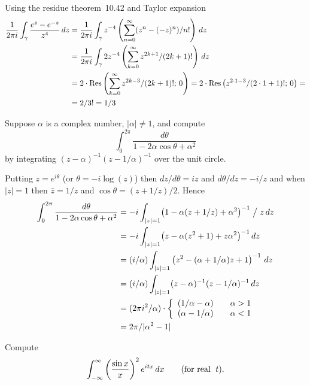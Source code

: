 \begin{enumerate}
Using the residue theorem~10.42 and Taylor expansion
\begin{align*}
\frac{1}{2\pi i} \int_\gamma \frac{e^z - e^{-z}}{z^4}\,dz
&= \frac{1}{2\pi i} \int_\gamma z^{-4}\left(\sum_{n=0}^\infty (z^n - (-z)^n)/n!\right)\,dz \\
&= \frac{1}{2\pi i} \int_\gamma 2z^{-4}\left(\sum_{k=0}^\infty z^{2k+1}/(2k+1)!\right)\,dz \\
&= 2\cdot\mathop{\rm Res}\nolimits\left(\sum_{k=0}^\infty z^{2k-3}/(2k+1)!;\,0\right)
 = 2\cdot\mathop{\rm Res}\nolimits\left(z^{2\cdot 1-3}/(2\cdot 1+1)!;\,0\right) = \\
&= 2/3! = 1/3
\end{align*}


\begin{excopy}
Suppose \(\alpha\) is a complex number, \(|\alpha|\neq 1\), and compute
\begin{equation*}
\int_0^{2\pi} \frac{d\theta}{1 - 2\alpha \cos\theta + \alpha^2}
\end{equation*}
by integrating \((z-\alpha)^{-1}(z-1/\alpha)^{-1}\) over the unit circle.
\end{excopy}

Putting \(z=e^{i\theta}\) (or \(\theta = -i\log(z)\))
then \(dz/d\theta = iz\) and \(d\theta/dz = -i/z\)
and when \(|z|=1\)
then \(\bar{z}=1/z\) and \(\cos \theta = (z+1/z)/2\).
Hence
\begin{align*}
\int_0^{2\pi} \frac{d\theta}{1 - 2\alpha \cos\theta + \alpha^2}
&= -i \int_{|z|=1} \bigl(1 - \alpha(z+1/z) + \alpha^2\bigr)^{-1} \bigm/ z\,dz \\
&= -i \int_{|z|=1} \bigl(z - \alpha(z^2+1) + z\alpha^2\bigr)^{-1}\,dz \\
&= (i/\alpha)  \int_{|z|=1} \left(z^2 - (\alpha+1/\alpha)z+1\right)^{-1}\,dz \\
&= (i/\alpha)  \int_{|z|=1} (z-\alpha)^{-1}(z-1/\alpha)^{-1}\,dz \\
&= (2\pi i^2/\alpha) \cdot \left\{%
   \begin{array}{ll}
   (1/\alpha - \alpha) \quad & \alpha > 1 \\
   (\alpha - 1/\alpha) \quad & \alpha < 1 \\
   \end{array}\right. \\
&= 2\pi / |\alpha^2 - 1|
\end{align*}


\begin{excopy}
Compute
\begin{equation*}
\int_{-\infty}^\infty \left(\frac{\sin x}{x}\right)^2 e^{itx}\,dx
\qquad (\textnormal{for real }\; t).
\end{equation*}
\end{excopy}


\end{enumerate}
